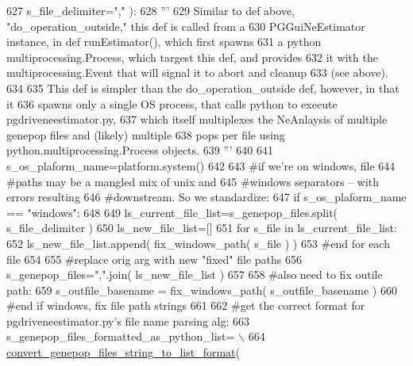 \begin{DoxyCode}
627                                         s\_file\_delimiter=\textcolor{stringliteral}{","} ):
628     \textcolor{stringliteral}{'''}
629 \textcolor{stringliteral}{    Similar to def above, "do\_operation\_outside," this def is called from a}
630 \textcolor{stringliteral}{    PGGuiNeEstimator instance, in def runEstimator(), which first spawns}
631 \textcolor{stringliteral}{    a python multiprocessing.Process, which targest this def, and provides}
632 \textcolor{stringliteral}{    it with the multiprocessing.Event that will signal it to abort and cleanup}
633 \textcolor{stringliteral}{    (see above).}
634 \textcolor{stringliteral}{}
635 \textcolor{stringliteral}{    This def is simpler than the do\_operation\_outside def, however, in that it}
636 \textcolor{stringliteral}{    spawns only a single OS process, that calls python to execute pgdriveneestimator.py,}
637 \textcolor{stringliteral}{    which itself multiplexes the NeAnlaysis of multiple genepop files and (likely) multiple}
638 \textcolor{stringliteral}{    pops per file using python.multiprocessing.Process objects.}
639 \textcolor{stringliteral}{    '''}
640 
641     s\_os\_plaform\_name=platform.system()
642     
643     \textcolor{comment}{#if we're on windows, file}
644     \textcolor{comment}{#paths may be a mangled mix of unix and }
645     \textcolor{comment}{#windows separators -- with errors resulting}
646     \textcolor{comment}{#downstream.  So we standardize:}
647     \textcolor{keywordflow}{if} s\_os\_plaform\_name == \textcolor{stringliteral}{"windows"}:
648 
649         ls\_current\_file\_list=s\_genepop\_files.split( s\_file\_delimiter )
650         ls\_new\_file\_list=[]
651         \textcolor{keywordflow}{for} s\_file \textcolor{keywordflow}{in} ls\_current\_file\_list:
652             ls\_new\_file\_list.append( fix\_windows\_path( s\_file ) )
653         \textcolor{comment}{#end for each file}
654         
655         \textcolor{comment}{#replace orig arg with new "fixed" file paths}
656         s\_genepop\_files=\textcolor{stringliteral}{","}.join( ls\_new\_file\_list )
657 
658         \textcolor{comment}{#also need to fix outile path:}
659         s\_outfile\_basename = fix\_windows\_path( s\_outfile\_basename )
660     \textcolor{comment}{#end if windows, fix file path strings}
661 
662     \textcolor{comment}{#get the correct format for pgdriveneestimator.py's file name parsing alg:}
663     s\_genepop\_files\_formatted\_as\_python\_list= \(\backslash\)
664             \hyperlink{namespacenegui_1_1pgutilities_aed0f15b22462914445ffe1ec2a77cbc8}{convert\_genepop\_files\_string\_to\_list\_format}( 

\end{DoxyCode}
